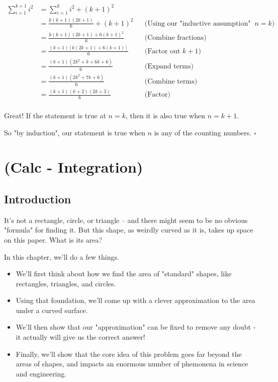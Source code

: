 \documentclass{book}
\begin{document}
\begin{align*}
\sum_{i=1}^{k+1} i^2 &= \sum_{i=1}^{k} i^2 + (k+1)^2 \\
&= \frac{k(k+1)(2k+1)}{6} + (k+1)^2 && \text{(Using our "inductive assumption" that the statement is true at $n = k$)} \\
&= \frac{k(k+1)(2k+1) + 6(k+1)^2}{6} && \text{(Combine fractions)} \\
&= \frac{(k+1)\left[k(2k+1) + 6(k+1)\right]}{6} && \text{(Factor out $k+1$)} \\
&= \frac{(k+1)(2k^2 + k + 6k + 6)}{6} && \text{(Expand terms)} \\
&= \frac{(k+1)(2k^2 + 7k + 6)}{6} && \text{(Combine terms)} \\
&= \frac{(k+1)(k+2)(2k+3)}{6} && \text{(Factor)} \\
\end{align*}

Great! If the statement is true at $n = k$, then it is also true when $n = k + 1$. 

So "by induction", our statement is true when $n$ is any of the counting numbers. $\square$



\chapter{(Calc - Integration)}

\section{Introduction}

It's not a rectangle, circle, or triangle -- and there might seem to be no obvious "formula" for finding it. But this shape, as weirdly curved as it is, takes up space on this paper. What is its area? 


In this chapter, we'll do a few things. 

\begin{itemize}
\item We'll first think about how we find the area of "standard" shapes, like rectangles, triangles, and circles.
\item Using that foundation, we'll come up with a clever approximation to the area under a curved surface. 
\item We'll then show that our "approximation" can be fixed to remove any doubt - it actually will give us the correct answer!
\item Finally, we'll show that the core idea of this problem goes far beyond the areas of shapes, and impacts an enormous number of phemonena in science and engineering.
\end{itemize}
\end{document}
